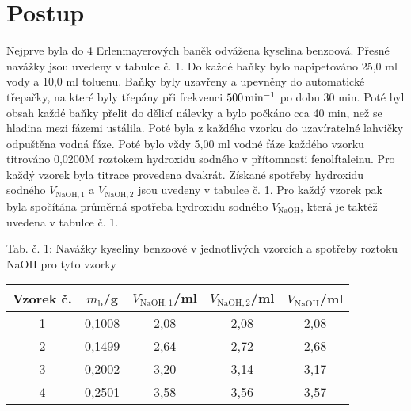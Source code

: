 \documentclass[12pt,a4paper]{article}
\def\ri#1{\mathrm{#1}}
\def\jd#1{\ifmmode\,\mathrm{#1}\else\,\textrm{#1}\fi}
\begin{document}
\section*{Postup}
Nejprve byla do 4 Erlenmayerových baněk odvážena kyselina benzoová. Přesné navážky jsou uvedeny v tabulce č. 1. Do každé baňky bylo napipetováno 25,0\jd{ml} vody a 10,0\jd{ml} toluenu. Baňky byly uzavřeny a upevněny do automatické třepačky, na které byly třepány při frekvenci $500\jd{min^{-1}}$ po dobu 30\jd{min}. Poté byl obsah každé baňky přelit do dělicí nálevky a bylo počkáno cca 40\jd{min}, než se hladina mezi fázemi ustálila. Poté byla z každého vzorku do uzavíratelné lahvičky odpuštěna vodná fáze. Poté bylo vždy 5,00\jd{ml} vodné fáze každého vzorku titrováno 0,0200M roztokem hydroxidu sodného v přítomnosti fenolftaleinu. Pro každý vzorek byla titrace provedena dvakrát. Získané spotřeby hydroxidu sodného $V_\ri{NaOH, 1}$ a $V_\ri{NaOH, 2}$ jsou uvedeny v tabulce č. 1. Pro každý vzorek pak byla spočítána průměrná spotřeba hydroxidu sodného $V_\ri{NaOH}$, která je taktéž uvedena v tabulce č. 1.
\begin{center}
	\noindent Tab. č. 1: Navážky kyseliny benzoové v jednotlivých vzorcích a spotřeby roztoku NaOH pro tyto vzorky\\
	\begin{tabular}{c|c|c|c|c}
		Vzorek č. & $m_\ri{b}$/g & $V_\ri{NaOH, 1}$/ml & $V_\ri{NaOH, 2}$/ml & $V_\ri{NaOH}$/ml\\
		\hline
		1 & 0,1008 & 2,08 & 2,08 & 2,08\\
		2 & 0,1499 & 2,64 & 2,72 & 2,68\\
		3 & 0,2002 & 3,20 & 3,14 & 3,17\\
		4 & 0,2501 & 3,58 & 3,56 & 3,57\\
	\end{tabular}
\end{center}
\end{document}

